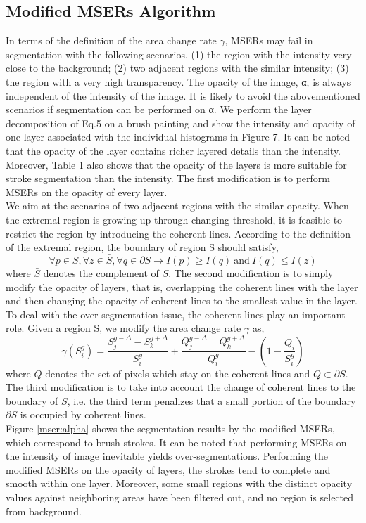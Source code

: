 \subsection{Modified MSERs Algorithm}
In terms of the definition of the area change rate $\gamma$, MSERs may fail in segmentation with the following scenarios, (1) the region with the intensity very close to the background; (2) two adjacent regions with the similar intensity; (3) the region with a very high transparency. The opacity of the image, α, is always independent of the intensity of the image. It is likely to avoid the abovementioned scenarios if segmentation can be performed on α. We perform the layer decomposition of Eq.5 on a brush painting and show the intensity and opacity of one layer associated with the individual histograms in Figure 7. It can be noted that the opacity of the layer contains richer layered details than the intensity. Moreover, Table 1 also shows that the opacity of the layers is more suitable for stroke segmentation than the intensity. The first modification is to perform MSERs on the opacity of every layer.\\
We aim at the scenarios of two adjacent regions with the similar opacity. When the extremal region is growing up through changing threshold, it is feasible to restrict the region by introducing the coherent lines. According to the definition of the extremal region, the boundary of region S should satisfy,
\begin{equation}
\forall p \in S,\forall z \in   \bar{S} , \forall q \in \partial S \longrightarrow I(p) \geq I(q)  ~\mathrm{and}~  I(q) \leq I(z)
\end{equation}
where $ \bar{S} $ denotes the complement of $S$. The second modification is to simply modify the opacity of layers, that is, overlapping the coherent lines with the layer and then changing the opacity of coherent lines to the smallest value in the layer.
To deal with the over-segmentation issue, the coherent lines play an important role. Given a region S, we modify the area change rate $\gamma$ as,
\begin{equation}
\gamma(S_i^g)=\frac{ S_j^{g-\Delta} -  S_k^{g+\Delta} }{ S_i^g } + \frac{ Q_j^{g-\Delta} -  Q_k^{g+\Delta}}{ Q_i^g } - (1-\frac{  Q_i }{    S_i^g  } )
\end{equation}
where $Q$ denotes the set of pixels which stay on the coherent lines and $Q \subset \partial S $. The third modification is to take into account the change of coherent lines to the boundary of $S$, i.e. the third term penalizes that a small portion of the boundary $\partial S$ is occupied by coherent lines.\\
Figure \ref{mser:alpha} shows the segmentation results by the modified MSERs, which correspond to brush strokes. It can be noted that performing MSERs on the intensity of image inevitable yields over-segmentations. Performing the modified MSERs on the opacity of layers, the strokes tend to complete and smooth within one layer. Moreover, some small regions with the distinct opacity values against neighboring areas have been filtered out, and no region is selected from background. 